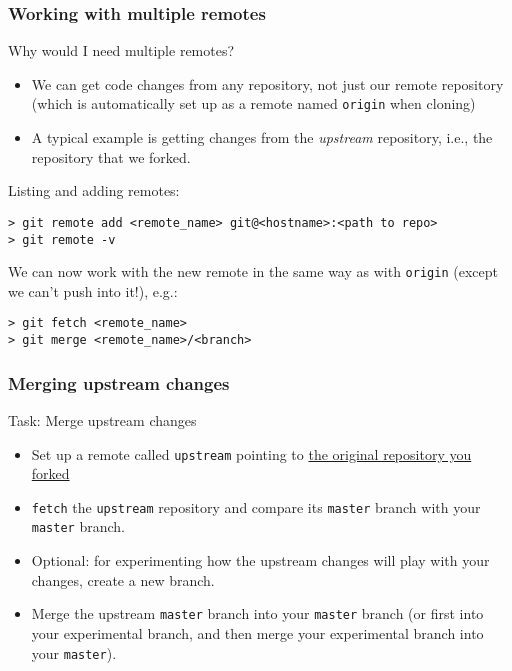 
\begin{frame}[fragile]
	
\frametitle{Working with multiple remotes}
	
\begin{block}{Why would I need multiple remotes?}
	\begin{itemize}
	\item We can get code changes from any repository, not just our remote repository (which is automatically set up as a remote named \texttt{origin} when cloning)
	\item A typical example is getting changes from the \textit{upstream} repository, i.e., the repository that we forked.
	\end{itemize}
\end{block}	

Listing and adding remotes:
\begin{verbatim}
> git remote add <remote_name> git@<hostname>:<path to repo>	
> git remote -v	
\end{verbatim}
	
We can now work with the new remote in the same way as with \texttt{origin} (except we can't push into it!), e.g.:
\begin{verbatim}
> git fetch <remote_name>
> git merge <remote_name>/<branch>
\end{verbatim}
	
\end{frame}


\begin{frame}

\frametitle{Merging upstream changes}

\begin{block}{Task: Merge upstream changes}
	\begin{itemize}
	\item Set up a remote called \texttt{upstream} pointing to \href{https://github.com/larics/git-tutorial-code.git}{the original repository you forked}
	\item \texttt{fetch} the \texttt{upstream} repository and compare its \texttt{master} branch with your \texttt{master} branch.
	\item Optional: for experimenting how the upstream changes will play with your changes, create a new branch.
	\item Merge the upstream \texttt{master} branch into your \texttt{master} branch (or first into your experimental branch, and then merge your experimental branch into your \texttt{master}).
	\end{itemize}
\end{block}

\end{frame}

